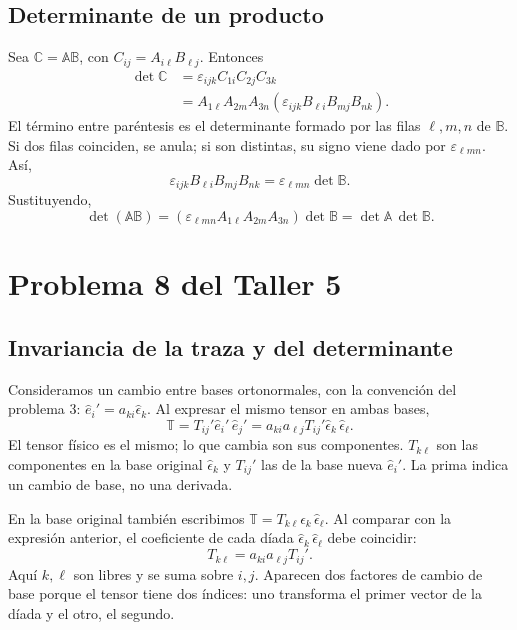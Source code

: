 \subsection{Determinante de un producto}

Sea $\mathbb C=\mathbb A\mathbb B$, con $C_{ij}=A_{i\ell}B_{\ell j}$. Entonces
\[
\begin{aligned}
\det\mathbb C
&=\varepsilon_{ijk}C_{1i}C_{2j}C_{3k}\\
&=A_{1\ell}A_{2m}A_{3n}
\left(\varepsilon_{ijk}B_{\ell i}B_{mj}B_{nk}\right).
\end{aligned}
\]
El término entre paréntesis es el determinante formado por las filas $\ell,m,n$ de $\mathbb B$. Si dos filas coinciden, se anula; si son distintas, su signo viene dado por $\varepsilon_{\ell mn}$. Así,
\[
\varepsilon_{ijk}B_{\ell i}B_{mj}B_{nk}
=\varepsilon_{\ell mn}\det\mathbb B.
\]
Sustituyendo,
\[
\det(\mathbb A\mathbb B)
=\left(\varepsilon_{\ell mn}A_{1\ell}A_{2m}A_{3n}\right)\det\mathbb B
=\boxed{\det\mathbb A\,\det\mathbb B}.
\]

\section{Problema 8 del Taller 5}

\subsection{Invariancia de la traza y del determinante}

Consideramos un cambio entre bases ortonormales, con la convención del problema 3: $\hat e_i'=a_{ki}\hat\epsilon_k$. Al expresar el mismo tensor en ambas bases,
\[
\mathbb T=T_{ij}'\hat e_i'\,\hat e_j'
=a_{ki}a_{\ell j}T_{ij}'\hat\epsilon_k\,\hat\epsilon_\ell.
\]
El tensor físico es el mismo; lo que cambia son sus componentes. $T_{k\ell}$ son las componentes en la base original $\hat\epsilon_k$ y $T_{ij}'$ las de la base nueva $\hat e_i'$. La prima indica un cambio de base, no una derivada.

En la base original también escribimos $\mathbb T=T_{k\ell}\hat\epsilon_k\,\hat\epsilon_\ell$. Al comparar con la expresión anterior, el coeficiente de cada díada $\hat\epsilon_k\,\hat\epsilon_\ell$ debe coincidir:
\[
\boxed{T_{k\ell}=a_{ki}a_{\ell j}T_{ij}'}.
\]
Aquí $k,\ell$ son libres y se suma sobre $i,j$. Aparecen dos factores de cambio de base porque el tensor tiene dos índices: uno transforma el primer vector de la díada y el otro, el segundo.

